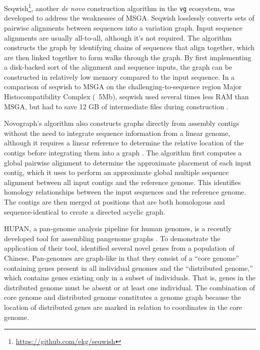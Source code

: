 Seqwish\footnote{\url{https://github.com/ekg/seqwish}}, another \textit{de novo} construction algorithm in the \texttt{vg} ecosystem, was developed to address the weaknesses of MSGA.
Seqwish losslessly converts sets of pairwise alignments between sequences into a variation graph.
Input sequence alignments are usually all-to-all, although it's not required.
The algorithm constructs the graph by identifying chains of sequences that align together, which are then linked together to form walks through the graph.
By first implementing a disk-backed sort of the alignment and sequence inputs, the graph can be constructed in relatively low memory compared to the input sequence.
In a comparison of seqwish to MSGA on the challenging-to-sequence region Major Histocompatibility Complex (~5Mb), seqwish used several times less RAM than MSGA, but had to save 12 GB of intermediate files during construction .


Novograph's algorithm also constructs graphs directly from assembly contigs without the need to integrate sequence information from a linear genome, although it requires a linear reference to determine the relative location of the contigs before integrating them into a graph \cite{Biederstedt2018}. 
The algorithm first computes a global pairwise alignment to determine the approximate placement of each input contig, which it uses to perform an approximate global multiple sequence alignment between all input contigs and the reference genome.
This identifies homology relationships between the input sequences and the reference genome.
The contigs are then merged at positions that are both homologous and sequence-identical to create a directed acyclic graph.

 
HUPAN, a pan-genome analysis pipeline for human genomes, is a recently developed tool for assembling pangenome graphs \cite{Duan_2019}. 
To demonstrate the application of their tool, \citep{Duan_2019} identified several novel genes from a population of Chinese.
Pan-genomes are graph-like in that they consist of a ``core genome'' containing genes present in all individual genomes and the ``distributed genome,'' which contains genes existing only in a subset of individuals.
That is, genes in the distributed genome must be absent or at least one individual.
The combination of core genome and distributed genome constitutes a genome graph because the location of distributed genes are marked in relation to coordinates in the core genome.

